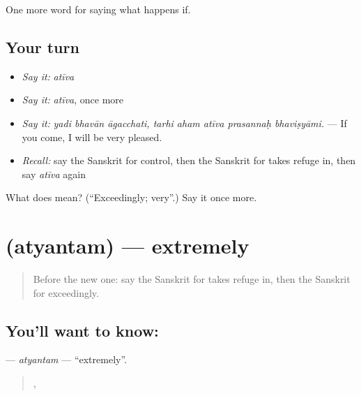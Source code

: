 \begin{grammarlens}[title={What you've built}]
One more word for saying what happens if.
\end{grammarlens}

\subsection*{Your turn}
\begin{itemize}
\raggedright
  \item \emph{Say it:} \emph{atīva}
  \item \emph{Say it:} \emph{atīva}, once more
  \item \emph{Say it:} \emph{yadi bhavān āgacchati, tarhi aham atīva prasannaḥ bhaviṣyāmi.} — If you come, I will be very pleased.
  \item \emph{Recall:} say the Sanskrit for control, then the Sanskrit for takes refuge in, then say \emph{atīva} again
\end{itemize}

\begin{tcolorbox}[breakable,colback=teal!4,colframe=teal!35!black,title={Before you move on}]
What does  mean? (\textquotedblleft{}Exceedingly; very\textquotedblright{}.) Say it once more.
\end{tcolorbox}
\section[\texorpdfstring{\sk{अत्यन्तम्} (atyantam)}{अत्यन्तम् (atyantam)}]{ (atyantam) — extremely}

\label{lesson:SA-C377-atyantam}



\begin{quote}
Before the new one: say the Sanskrit for takes refuge in, then the Sanskrit for exceedingly.
\end{quote}

\subsection*{You'll want to know: }
\textbf{} — \emph{atyantam} — \textquotedblleft{}extremely\textquotedblright{}.

\begin{quote}
   ,     
\end{quote}

